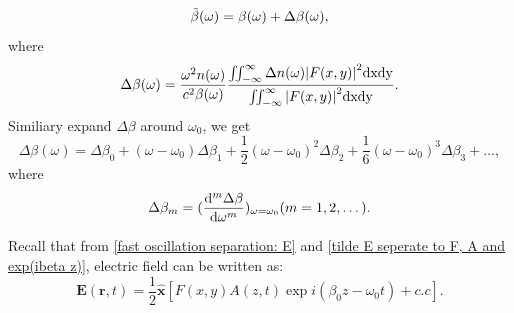 \documentclass[12pt]{extarticle}
\numberwithin{equation}{section}
\numberwithin{figure}{section}
\numberwithin{table}{section}
\newcommand{\<}{\langle}
\renewcommand{\>}{\rangle}
\theoremstyle{definition}
\begin{document}
\begin{itemize}
{\begin{equation}
                    \Tilde{\beta}(\omega) = \beta(\omega) + \Delta \beta(\omega),
                    \label{tilde beta and delta beta relation}
                \end{equation}
                where
                \begin{equation}
                    \Delta \beta(\omega) = \frac{\omega^2 n(\omega)}{c^2 \beta(\omega)} \frac{\iint _{-\infty}^\infty \Delta n(\omega) \abs{F(x,y)}^2 \mathrm{dxdy}}{\iint_{-\infty}^\infty \abs{F(x,y)}^2 \mathrm{dxdy}}.
                    \label{delta beta intergral relation with F(x,y)}
                \end{equation}
                Similiary expand $\Delta \beta$ around $\omega_0$, we get
                \begin{equation}
                    \Delta \beta(\omega) = \Delta \beta_0 + (\omega-\omega_0)\Delta \beta_1 + \frac{1}{2}(\omega-\omega_0)^2\Delta \beta_2 + \frac{1}{6}(\omega-\omega_0)^3\Delta \beta_3 + \dots,
                    \label{Delta beta omega expands around omega 0}
                \end{equation}
                where
                \begin{equation}
                    \Delta \beta_m = (\dv[m]{\Delta \beta}{\omega})_{\omega=\omega_0}     (m=1,2,\dots).
                    \label{Delta beta m expression as Delta beta derivative}
                \end{equation}
            }
            
            Recall that from \autoref{fast oscillation separation: E} and \autoref{tilde E seperate to F, A and exp(ibeta z)}, electric field can be written as:
            \begin{equation}
                \boldsymbol{E}(\boldsymbol{r},t)=\frac{1}{2}\boldsymbol{\hat{x}}[F(x,y)A(z,t)\exp{i(\beta_0 z-\omega_0 t)}+c.c].
                \label{E = F*A expression}
            \end{equation}
            

\end{itemize}
\end{document}

